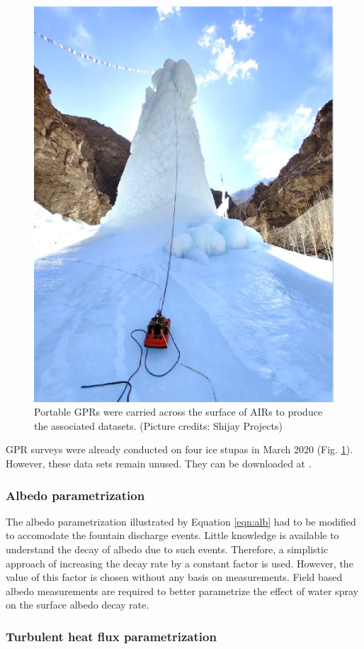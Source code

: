 \begin{figure}[htb]
  \centering
	\includegraphics[width=8 cm]{figs/gpr_survey}
  \caption{Portable \ac{GPR}s were carried across the surface of \ac{AIRs} to produce the associated datasets. (Picture credits:
  Shijay Projects)}
	\label{fig:gpr_survey}
\end{figure}

\ac{GPR} surveys were already conducted on four ice stupas in March 2020 (Fig. \ref{fig:gpr_survey}). However,
these data sets remain unused. They can be downloaded at \citet{balasubramanian_suryanarayanan_2022_7056646}.

\subsubsection{Albedo parametrization}

The albedo parametrization illustrated by Equation \ref{eqn:alb} had to be modified to accomodate the fountain
discharge events. Little knowledge is available to understand the decay of albedo due to such events. Therefore,
a simplistic approach of increasing the decay rate by a constant factor is used. However, the value of this
factor is chosen without any basis on measurements. Field based albedo measurements are required to better
parametrize the effect of water spray on the surface albedo decay rate.

\subsubsection{Turbulent heat flux parametrization}


